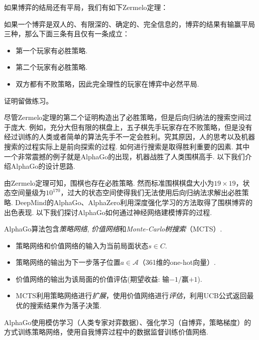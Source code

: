 如果博弈的结局还有平局，我们有如下Zermelo定理：
\begin{theorem}[有平局的Zermelo定理]\label{thm:zermelo-draw}
如果一个博弈是双人的、有限深的、确定的、完全信息的，博弈的结果有输赢平局三种，那么下面三条有且仅有一条成立：
\begin{itemize}
    \item 第一个玩家有必胜策略.
    \item 第二个玩家有必胜策略.
    \item 双方都有不败策略，因此完全理性的玩家在博弈中必然平局.
\end{itemize}
\end{theorem}
证明留做练习。

尽管Zermelo定理的第二个证明构造出了必胜策略，但是后向归纳法的搜索空间过于庞大. 例如，充分大但有限的棋盘上，五子棋先手玩家存在不败策略，但是没有经过训练的人类或者简单的算法先手不一定会胜利。究其原因，人的思考以及机器搜索的过程实际上是前向探索的过程. 如何进行搜索是取得胜利重要的因素. 其中一个非常震撼的例子就是AlphaGo的出现，机器战胜了人类围棋高手. 以下我们介绍AlphaGo的设计思路.

由Zermelo定理可知，围棋也存在必胜策略. 然而标准围棋棋盘大小为$19\times 19$，状态空间量级为$10^{170}$，过大的状态空间使得我们无法使用后向归纳法求解出必胜策略. DeepMind的AlphaGo、AlphaZero利用深度强化学习的方法取得了围棋博弈的出色表现. 以下我们探讨AlphaGo如何通过神经网络建模博弈的过程.

AlphaGo算法包含\emph{策略网络}, \emph{价值网络}和\emph{Monte-Carlo树搜索}（MCTS）.
\begin{itemize}
    \item 策略网络和价值网络的输入为当前局面状态$s\in C$. 
    \item 策略网络的输出为下一步落子位置$a\in\mathcal A$（361维的one-hot向量）.
    \item 价值网络的输出为该局面的价值评估(期望收益: 输$-1$/赢$+1$).
    \item MCTS利用策略网络进行\emph{扩展}，使用价值网络进行\emph{评估}，利用UCB公式返回最优的搜索结果作为落子决策.
\end{itemize}

AlphaGo使用模仿学习（人类专家对弈数据）、强化学习（自博弈，策略梯度）的方式训练策略网络，使用自我博弈过程中的数据监督训练价值网络.



